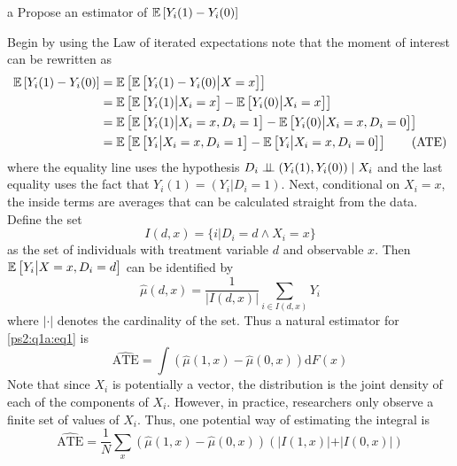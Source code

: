 \documentclass{article}
\begin{document}
\begin{problem}{a}
Propose an estimator of $\mathbb{E}\left[Y_{i}(1)-Y_{i}(0)\right]$
\end{problem}
\begin{solution}
Begin by using the Law of iterated expectations note that the moment of interest can be rewritten as
\begin{align*}
    \mathbb{E}\left[Y_{i}(1)-Y_{i}(0)\right] &= \mathbb{E}\left[\mathbb{E}\left[Y_{i}(1)-Y_{i}(0)\big\vert X = x\right]\right] \\ 
    &= \mathbb{E}\left[\mathbb{E}\left[Y_{i}(1)\big\vert X_i = x\right]-\mathbb{E}\left[Y_{i}(0)\big\vert X_i = x\right]\right] \\ 
    &= \mathbb{E}\left[\mathbb{E}\left[Y_{i}(1)\big\vert X_i = x,D_i=1\right]-\mathbb{E}\left[Y_{i}(0)\big\vert X_i = x, D_i=0\right]\right] \\ 
    &= \mathbb{E}\left[\mathbb{E}\left[Y_{i}\big\vert X_i = x,D_i=1\right]-\mathbb{E}\left[Y_{i}\big\vert X_i = x, D_i=0\right]\right] \tag{ATE}\label{ps2:q1a:eq1}
\end{align*}
where the equality line uses the hypothesis $D_{i} \perp\!\!\!\perp \left(Y_{i}(1), Y_{i}(0)\right) \mid X_{i}$ and the last equality uses the fact that $Y_i(1) = \left(Y_i\vert D_i=1\right)$. Next, conditional on $X_i=x$, the inside terms are averages that can be calculated straight from the data. Define the set 
\begin{equation*}
    I(d,x)=\{i\vert D_i=d\land X_i=x\}
\end{equation*}  as the set of individuals with treatment variable $d$ and observable $x$. Then $\mathbb{E}\left[Y_{i}\big\vert X = x,D_i=d\right]$ can be identified by 
\begin{equation*}
    \hat{\mu}(d,x) = \frac{1}{\vert I(d,x)\vert} \sum_{i\in I(d,x)} Y_i
\end{equation*} where $\vert\cdot\vert$ denotes the cardinality of the set. Thus a natural estimator for \eqref{ps2:q1a:eq1} is 
\begin{equation*}
    \widehat{\text{ATE}} = \int (\hat{\mu}(1,x)-\hat{\mu}(0,x))\mathrm{d}F(x)
\end{equation*}
Note that since $X_i$ is potentially a vector, the distribution is the joint density of each of the components of $X_i$. However, in practice, researchers only observe a finite set of values of $X_i$. Thus, one potential way of estimating the integral is 
\begin{equation*}
    \widehat{\text{ATE}} = \frac{1}{N}\sum_{x} (\hat{\mu}(1,x)-\hat{\mu}(0,x))(\vert I(1,x)\vert+\vert I(0,x)\vert)
\end{equation*}
\end{solution}
\end{document}
